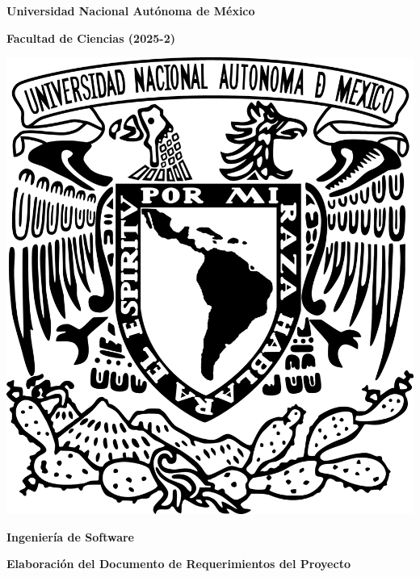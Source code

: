 \documentclass[12pt]{article}
\begin{document}
\begin{titlepage}
    \centering
    
    \Large\bfseries Universidad Nacional Autónoma de México \par
    \vspace{0.5cm}
    \large\bfseries Facultad de Ciencias (2025-2) \par
    \vspace{2cm}
    
    \includegraphics[scale=.25]{Imagenes/LOGO_UNAM.png} \par
    \vspace{2cm}
    
    \Huge\bfseries Ingeniería de Software\par
    \vspace{1cm}
    
    \Large\bfseries Elaboración del Documento de Requerimientos del Proyecto \par
    \vspace{1cm}
    \vspace{0.5cm}
    

\end{titlepage}
\end{document}
